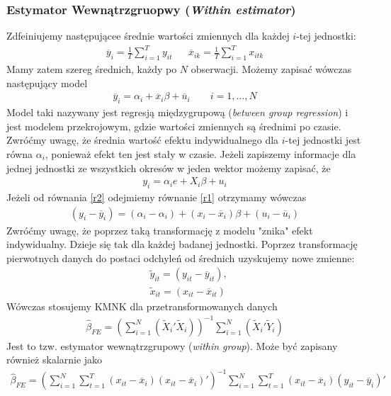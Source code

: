 \subsubsection{Estymator Wewnątrzgruopwy (\emph{Within estimator})}
Zdfeiniujemy następującee średnie wartości zmiennych dla każdej $ i $-tej jednostki:
\begin{align*}
\overline{y}_i=\frac{1}{T}\sum_{i=1}^{T}y_{it}
&&
\overline{x}_{ik}=\frac{1}{T}\sum_{i=1}^{T}x_{itk}
\end{align*}
Mamy zatem szereg średnich, każdy po $ N $ obserwacji. Możemy zapisać wówczas następujący model
\begin{gather}
\overline y_i=\alpha_i+\overline x_i\beta+\overline u_i\qquad i=1,\dots,N\label{r1}
\end{gather}
Model taki nazywany jest regresją międzygrupową (\emph{between group regression}) i jest modelem przekrojowym, gdzie wartości zmiennych są średnimi po czasie. Zwróćmy uwagę, że średnia wartość efektu indywidualnego dla $ i $-tej jednostki jest równa $ \alpha_i $, ponieważ efekt ten jest stały w czasie. Jeżeli zapiszemy informacje dla jednej jednostki ze wszystkich okresów w jeden wektor możemy zapisać, że
\begin{gather}
y_i=\alpha_i e+X_i\beta+u_i\label{r2}
\end{gather}
Jeżeli od równania \eqref{r2} odejmiemy równanie \eqref{r1} otrzymamy wówczas
\begin{gather*}
\left(y_i-\overline y_i\right)=\left(\alpha_i-\alpha_i\right)+
\left(x_i-\overline x_i\right)\beta+
\left(u_i-\overline u_i\right)
\end{gather*}
Zwróćmy uwagę, że poprzez taką transformację z modelu "znika" efekt indywidualny. Dzieje się tak dla każdej badanej jednostki. Poprzez transformację pierwotnych danych do postaci odchyleń od średnich uzyskujemy nowe zmienne:
\begin{align*}
&\tilde y_{it}=(y_{it}-\overline y_{it}),\\
&\tilde x_{it}=(x_{it}-\overline x_{it})
\end{align*}
Wówczas stosujemy KMNK dla przetransformowanych danych
\begin{gather*}
\hat \beta_{FE}=\left(\sum_{i=1}^{N}(\tilde X_i'\tilde X_i)\right)^{-1}\sum_{i=1}^{N}(\tilde X_i'\tilde Y_i)
\end{gather*}
Jest to tzw. estymator wewnątrzgrupowy (\emph{within group}). Może być zapisany również skalarnie jako
\begin{gather*}
\hat \beta_{FE}=
\left(\sum_{i=1}^{N}\sum_{t=1}^{T}(x_{it}-\overline x_{i})(x_{it}-\overline x_{i})'\right)^{-1}
\sum_{i=1}^{N}\sum_{t=1}^{T}(x_{it}-\overline x_{i})(y_{it}-\overline y_{i})'
\end{gather*}
